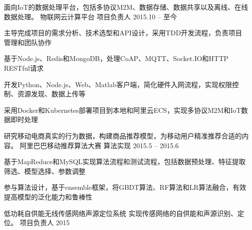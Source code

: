 


\begin{cventries}


\cventry
{面向IoT的数据处理平台，包括多协议M2M、数据存储、数据共享以及离线、在线数据处理。} %
{物联网云计算平台} %
{项目负责人} %
{2015.10 -- 至今} %
{ %
\begin{cvitems}
\item {主导完成项目的需求分析、技术选型和API设计，采用TDD开发流程，负责项目管理和团队协作}
\item {基于Node.js、Redis和MongoDB，处理CoAP、MQTT、Socket.IO和HTTP RESTful请求}
\item {开发Python、Node.js、Web、Matlab客户端，简化硬件入网流程，实现权限控制、资源发现、数据上传等}
\item{采用Docker和Kubernetes部署项目到本地和阿里云ECS，实现多协议M2M和IoT数据即时处理}
\end{cvitems}
}

\cventry
{研究移动电商真实的行为数据，构建商品推荐模型，为移动用户精准推荐合适的内容。} %
{阿里巴巴移动推荐算法大赛} %
{算法实现} %
{2015.5 -- 2015.6} %
{ %
\begin{cvitems}
\item {基于MapReduce和MySQL实现算法流程和测试流程，包括数据预处理、特征提取筛选、模型选择、参数调整}
\item {参与算法设计，基于ensemble框架，将GBDT算法、RF算法和LR算法融合，有效提高模型的泛化能力和鲁棒性}
\end{cvitems}
}

\begin{cvhonors}
\cvhonor
{低功耗自供能无线传感网络声源定位系统} %
{实现传感网络的自供能和声源识别、定位。} %
{项目负责人} %
{2015} %


\end{cvhonors}
\end{cventries}
